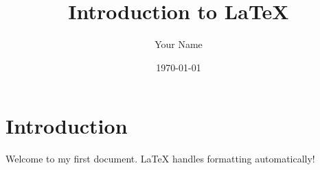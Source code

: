 \documentclass[12pt, a4paper]{article} %
\title{Introduction to \LaTeX}
\author{Your Name}
\date{\today}
\begin{document}
\maketitle %

\section{Introduction}
Welcome to my first document. LaTeX handles formatting automatically!
\end{document}
